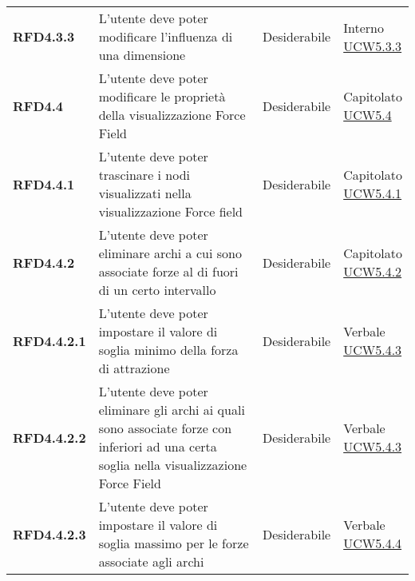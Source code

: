 \begin{longtable}[H]{| >{\raggedright\bfseries}m{20mm} | >{\raggedright}m{90mm} | >{\centering}m{25mm} | >{\centering\arraybackslash}m{30mm}|}
    RFD4.3.3
     & L'utente deve poter modificare l'influenza di una dimensione
     & Desiderabile
     & \makecell{ Interno                                                                                                \\ \hyperref[par:ucw5.3.3]{UCW5.3.3} }\\

    RFD4.4
     & L'utente deve poter modificare le proprietà della visualizzazione Force Field
     & Desiderabile
     & \makecell{ Capitolato                                                                                             \\ \hyperref[ssub:ucw5.4]{UCW5.4} }\\

    RFD4.4.1
     & L'utente deve poter trascinare i nodi visualizzati nella visualizzazione Force field
     & Desiderabile
     & \makecell{ Capitolato                                                                                             \\ \hyperref[par:ucw5.4.1]{UCW5.4.1} }\\

    RFD4.4.2
     & L'utente deve poter eliminare archi a cui sono associate forze al di fuori di un certo intervallo
     & Desiderabile
     & \makecell{ Capitolato                                                                                             \\ \hyperref[par:ucw5.4.2]{UCW5.4.2} }\\

    RFD4.4.2.1
     & L'utente deve poter impostare il valore di soglia minimo della forza di attrazione
     & Desiderabile
     & \makecell{ Verbale                                                                                                \\ \hyperref[par:ucw5.4.3]{UCW5.4.3} }\\

    RFD4.4.2.2
     & L'utente deve poter eliminare gli archi ai quali sono associate forze con inferiori ad una certa soglia
    nella visualizzazione Force Field
     & Desiderabile
     & \makecell{ Verbale                                                                                                \\ \hyperref[par:ucw5.4.3]{UCW5.4.3} }\\


    RFD4.4.2.3
     & L'utente deve poter impostare il valore di soglia massimo per le forze associate agli archi
     & Desiderabile
     & \makecell{ Verbale                                                                                                \\ \hyperref[par:ucw5.4.4]{UCW5.4.4} }\\


\end{longtable}
